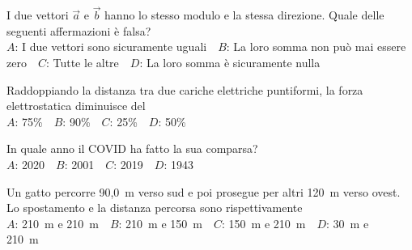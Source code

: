 \mcquestionfooter



\def\mcquestionnumber{12}


\mcquestionheader I due vettori $\vec{a}$ e $\vec{b}$ hanno lo stesso modulo e la stessa direzione. Quale delle seguenti affermazioni è falsa?\\
{$A$}: I due vettori sono sicuramente uguali\ \ {$B$}: La loro somma non può mai essere zero\ \ {$C$}: Tutte le altre\ \ {$D$}: La loro somma è sicuramente nulla\ \ 

\mcquestionfooter



\mcpaperfooter

\def\mcserialnumber{33}
\mcpaperheader


\def\mcquestionnumber{1}


\mcquestionheader Raddoppiando la distanza tra due cariche elettriche puntiformi, la forza elettrostatica diminuisce del\\
{$A$}: 75\%\ \ {$B$}: 90\%\ \ {$C$}: 25\%\ \ {$D$}: 50\%\ \ 

\mcquestionfooter



\def\mcquestionnumber{2}


\mcquestionheader In quale anno il COVID ha fatto la sua comparsa?\\
{$A$}: 2020\ \ {$B$}: 2001\ \ {$C$}: 2019\ \ {$D$}: 1943\ \ 

\mcquestionfooter



\def\mcquestionnumber{3}


\mcquestionheader Un gatto percorre 90,0~m verso sud e poi prosegue per altri 120~m verso ovest. Lo spostamento e la distanza percorsa sono rispettivamente\\
{$A$}: 210~m e 210~m\ \ {$B$}: 210~m e 150~m\ \ {$C$}: 150~m e 210~m\ \ {$D$}: 30~m e 210~m\ \ 

\mcquestionfooter



\def\mcquestionnumber{4}


